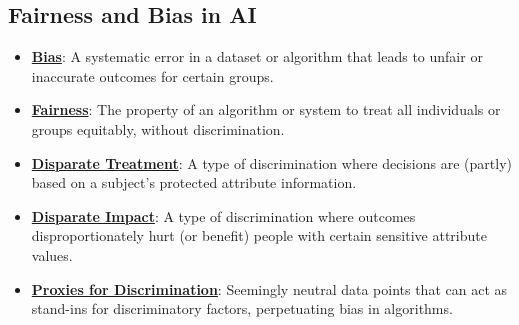 \documentclass{article}%
\begin{document}
\subsection{Fairness and Bias in AI}%
\label{subsec:FairnessandBiasinAI}%
\begin{itemize}[leftmargin=*]%
\item \href{https://purdue.brightspace.com/d2l/common/assets/pdfjs-d2l-dist/1.0.14-legacy/web/viewer.html?file=\%2Fcontent\%2Fenforced\%2F1095467-wl.202510.CS.24300.001\%2F16L2-ethics.pdf\%3Fou\%3D1095467\&lang=en-us\&container=d2l-fileviewer-rendered-pdf\&fullscreen=d2l-fileviewer-rendered-pdf-dialog\&height=667#page=2}{\textbf{Bias}}: A systematic error in a dataset or algorithm that leads to unfair or inaccurate outcomes for certain groups.%
\item \href{https://purdue.brightspace.com/d2l/common/assets/pdfjs-d2l-dist/1.0.14-legacy/web/viewer.html?file=\%2Fcontent\%2Fenforced\%2F1095467-wl.202510.CS.24300.001\%2F16L2-ethics.pdf\%3Fou\%3D1095467\&lang=en-us\&container=d2l-fileviewer-rendered-pdf\&fullscreen=d2l-fileviewer-rendered-pdf-dialog\&height=667#page=2}{\textbf{Fairness}}: The property of an algorithm or system to treat all individuals or groups equitably, without discrimination.%
\item \href{https://purdue.brightspace.com/d2l/common/assets/pdfjs-d2l-dist/1.0.14-legacy/web/viewer.html?file=\%2Fcontent\%2Fenforced\%2F1095467-wl.202510.CS.24300.001\%2F16L2-ethics.pdf\%3Fou\%3D1095467\&lang=en-us\&container=d2l-fileviewer-rendered-pdf\&fullscreen=d2l-fileviewer-rendered-pdf-dialog\&height=667#page=19}{\textbf{Disparate Treatment}}: A type of discrimination where decisions are (partly) based on a subject's protected attribute information.%
\item \href{https://purdue.brightspace.com/d2l/common/assets/pdfjs-d2l-dist/1.0.14-legacy/web/viewer.html?file=\%2Fcontent\%2Fenforced\%2F1095467-wl.202510.CS.24300.001\%2F16L2-ethics.pdf\%3Fou\%3D1095467\&lang=en-us\&container=d2l-fileviewer-rendered-pdf\&fullscreen=d2l-fileviewer-rendered-pdf-dialog\&height=667#page=19}{\textbf{Disparate Impact}}: A type of discrimination where outcomes disproportionately hurt (or benefit) people with certain sensitive attribute values.%
\item \href{https://purdue.brightspace.com/d2l/common/assets/pdfjs-d2l-dist/1.0.14-legacy/web/viewer.html?file=\%2Fcontent\%2Fenforced\%2F1095467-wl.202510.CS.24300.001\%2F16L2-ethics.pdf\%3Fou\%3D1095467\&lang=en-us\&container=d2l-fileviewer-rendered-pdf\&fullscreen=d2l-fileviewer-rendered-pdf-dialog\&height=667#page=13}{\textbf{Proxies for Discrimination}}: Seemingly neutral data points that can act as stand-ins for discriminatory factors, perpetuating bias in algorithms.%

\end{itemize}
\end{document}
